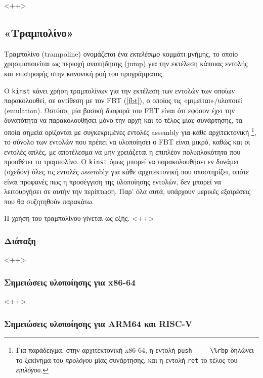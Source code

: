 \documentclass[12pt]{article}
\begin{document}
<++>

\subsection{«Τραμπολίνο»}


Τραμπολίνο (trampoline) ονομάζεται ένα \textit{εκτελέσιμο} κομμάτι μνήμης, το
οποίο χρησιμοποιείται ως περιοχή αναπήδησης (jump) για την εκτέλεση κάποιας
εντολής και επιστροφής στην κανονική ροή του προγράμματος.

Ο \lstinline{kinst} κάνει χρήση τραμπολίνων για την εκτέλεση των εντολών των
οποίων παρακολουθεί, σε αντίθεση με τον FBT (\ref{fbt}), ο οποίος τις
«μιμείται»/υλοποιεί (emulation). Ωστόσο, μία βασική διαφορά του FBT είναι ότι
εφόσον έχει την δυνατότητα να παρακολουθήσει μόνο την αρχή και το τέλος μίας
συνάρτησης, τα οποία σημεία ορίζονται με συγκεκριμένες εντολές assembly για
κάθε αρχιτεκτονική
\footnote{
	Για παράδειγμα, στην αρχιτεκτονική x86-64, η εντολή \lstinline{push
	\%rbp} δηλώνει το ξεκίνημα του \textit{προλόγου} μίας συνάρτησης, και η
	εντολή \lstinline{ret} το τέλος του \textit{επιλόγου}. %
},
το σύνολο των εντολών που πρέπει να υλοποίησει ο FBT είναι μικρό, καθώς και οι
εντολές απλές, με αποτέλεσμα να μην χρειάζεται η επιπλέον πολυπλοκότητα που
προσθέτει το τραμπολίνο. Ο \lstinline{kinst} όμως μπορεί να παρακολουθήσει εν
δυνάμει (σχεδόν) όλες τις εντολές assembly για κάθε αρχιτεκτονική που
υποστηρίζει, οπότε είναι προφανές πως η προσέγγιση της υλοποίησης εντολών, δεν
μπορεί να λειτουργήσει σε αυτήν την περίπτωση. Παρ' όλα αυτά, υπάρχουν μερικές
εξαιρέσεις που θα συζητηθούν παρακάτω. %

Η χρήση του τραμπολίνου γίνεται ως εξής. <++>

\subsubsection{Διάταξη}

<++>

\subsubsection{Σημειώσεις υλοποίησης για x86-64}

<++>

\subsubsection{Σημειώσεις υλοποίησης για ARM64 και RISC-V}
\end{document}

